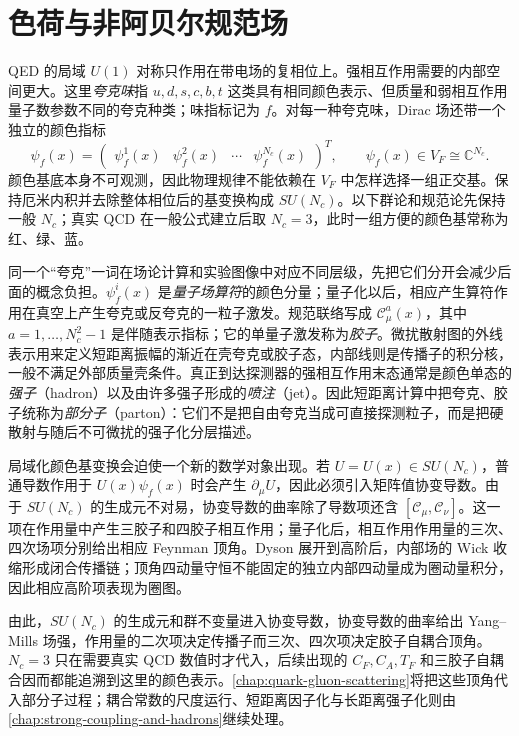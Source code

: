 \chapter{色荷与非阿贝尔规范场}\label{chap:qcd}

QED 的局域 $U(1)$ 对称只作用在带电场的复相位上。强相互作用需要的内部空间更大。这里\emph{夸克味}指 $u,d,s,c,b,t$ 这类具有相同颜色表示、但质量和弱相互作用量子数参数不同的夸克种类；味指标记为 $f$。对每一种夸克味，Dirac 场还带一个独立的颜色指标
\begin{equation*}
 \psi_f(x)
 =\begin{pmatrix}
 \psi_f^1(x)&\psi_f^2(x)&\cdots&\psi_f^{N_c}(x)
 \end{pmatrix}^{\!T},
 \qquad \psi_f(x)\in V_F\cong\mathbb C^{N_c}.
\end{equation*}
颜色基底本身不可观测，因此物理规律不能依赖在 $V_F$ 中怎样选择一组正交基。保持厄米内积并去除整体相位后的基变换构成 $SU(N_c)$。以下群论和规范论先保持一般 $N_c$；真实 QCD 在一般公式建立后取 $N_c=3$，此时一组方便的颜色基常称为红、绿、蓝。

同一个“夸克”一词在场论计算和实验图像中对应不同层级，先把它们分开会减少后面的概念负担。$\psi_f^i(x)$ 是\emph{量子场算符}的颜色分量；量子化以后，相应产生算符作用在真空上产生夸克或反夸克的一粒子激发。规范联络写成 $\mathscr C_\mu^a(x)$，其中 $a=1,\ldots,N_c^2-1$ 是伴随表示指标；它的单量子激发称为\emph{胶子}。微扰散射图的外线表示用来定义短距离振幅的渐近在壳夸克或胶子态，内部线则是传播子的积分核，一般不满足外部质量壳条件。真正到达探测器的强相互作用末态通常是颜色单态的\emph{强子}（hadron）以及由许多强子形成的\emph{喷注}（jet）。因此短距离计算中把夸克、胶子统称为\emph{部分子}（parton）：它们不是把自由夸克当成可直接探测粒子，而是把硬散射与随后不可微扰的强子化分层描述。

局域化颜色基变换会迫使一个新的数学对象出现。若 $U=U(x)\in SU(N_c)$，普通导数作用于 $U(x)\psi_f(x)$ 时会产生 $\partial_\mu U$，因此必须引入矩阵值协变导数。由于 $SU(N_c)$ 的生成元不对易，协变导数的曲率除了导数项还含 $[\mathscr C_\mu,\mathscr C_\nu]$。这一项在作用量中产生三胶子和四胶子相互作用；量子化后，相互作用作用量的三次、四次场项分别给出相应 Feynman 顶角。Dyson 展开到高阶后，内部场的 Wick 收缩形成闭合传播链；顶角四动量守恒不能固定的独立内部四动量成为圈动量积分，因此相应高阶项表现为圈图。

由此，$SU(N_c)$ 的生成元和群不变量进入协变导数，协变导数的曲率给出 Yang--Mills 场强，作用量的二次项决定传播子而三次、四次项决定胶子自耦合顶角。$N_c=3$ 只在需要真实 QCD 数值时才代入，后续出现的 $C_F,C_A,T_F$ 和三胶子自耦合因而都能追溯到这里的颜色表示。\cref{chap:quark-gluon-scattering}将把这些顶角代入部分子过程；耦合常数的尺度运行、短距离因子化与长距离强子化则由\cref{chap:strong-coupling-and-hadrons}继续处理。




